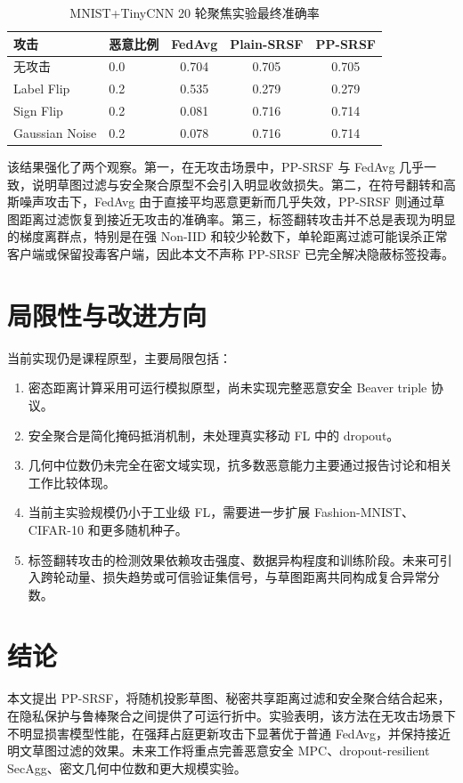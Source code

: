 \documentclass[UTF8,a4paper,zihao=-4]{ctexart}
\begin{document}
\begin{table}[h]
\centering
\caption{MNIST+TinyCNN 20 轮聚焦实验最终准确率}
\label{tab:tinycnn-long}
\begin{tabular}{llccc}
\toprule
攻击 & 恶意比例 & FedAvg & Plain-SRSF & PP-SRSF\\
\midrule
无攻击 & 0.0 & 0.704 & 0.705 & 0.705\\
Label Flip & 0.2 & 0.535 & 0.279 & 0.279\\
Sign Flip & 0.2 & 0.081 & 0.716 & 0.714\\
Gaussian Noise & 0.2 & 0.078 & 0.716 & 0.714\\
\bottomrule
\end{tabular}
\end{table}

该结果强化了两个观察。第一，在无攻击场景中，PP-SRSF 与 FedAvg 几乎一致，说明草图过滤与安全聚合原型不会引入明显收敛损失。第二，在符号翻转和高斯噪声攻击下，FedAvg 由于直接平均恶意更新而几乎失效，PP-SRSF 则通过草图距离过滤恢复到接近无攻击的准确率。第三，标签翻转攻击并不总是表现为明显的梯度离群点，特别是在强 Non-IID 和较少轮数下，单轮距离过滤可能误杀正常客户端或保留投毒客户端，因此本文不声称 PP-SRSF 已完全解决隐蔽标签投毒。

\section{局限性与改进方向}
当前实现仍是课程原型，主要局限包括：
\begin{enumerate}
  \item 密态距离计算采用可运行模拟原型，尚未实现完整恶意安全 Beaver triple 协议。
  \item 安全聚合是简化掩码抵消机制，未处理真实移动 FL 中的 dropout。
  \item 几何中位数仍未完全在密文域实现，抗多数恶意能力主要通过报告讨论和相关工作比较体现。
  \item 当前主实验规模仍小于工业级 FL，需要进一步扩展 Fashion-MNIST、CIFAR-10 和更多随机种子。
\item 标签翻转攻击的检测效果依赖攻击强度、数据异构程度和训练阶段。未来可引入跨轮动量、损失趋势或可信验证集信号，与草图距离共同构成复合异常分数。
\end{enumerate}

\section{结论}
本文提出 PP-SRSF，将随机投影草图、秘密共享距离过滤和安全聚合结合起来，在隐私保护与鲁棒聚合之间提供了可运行折中。实验表明，该方法在无攻击场景下不明显损害模型性能，在强拜占庭更新攻击下显著优于普通 FedAvg，并保持接近明文草图过滤的效果。未来工作将重点完善恶意安全 MPC、dropout-resilient SecAgg、密文几何中位数和更大规模实验。



\end{document}
